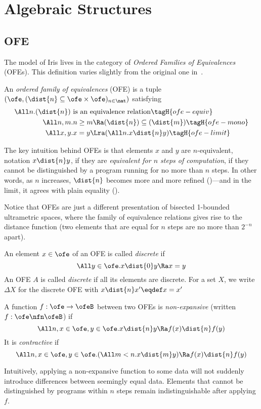 \section{Algebraic Structures}

\subsection{OFE}

The model of Iris lives in the category of \emph{Ordered Families of Equivalences} (OFEs).
This definition varies slightly from the original one in~\cite{catlogic}.

\begin{defn}
  An \emph{ordered family of equivalences} (OFE) is a tuple $(\ofe, ({\dist{n}} \subseteq \ofe \times \ofe)_{n \in \nat})$ satisfying
  \begin{align*}
    \All n. (\dist{n}) ~& \text{is an equivalence relation} \tagH{ofe-equiv} \\
    \All n, m.& n \geq m \Ra (\dist{n}) \subseteq (\dist{m}) \tagH{ofe-mono} \\
    \All x, y.& x = y \Lra (\All n. x \dist{n} y) \tagH{ofe-limit}
  \end{align*}
\end{defn}

The key intuition behind OFEs is that elements $x$ and $y$ are $n$-equivalent, notation $x \dist{n} y$, if they are \emph{equivalent for $n$ steps of computation}, \ie if they cannot be distinguished by a program running for no more than $n$ steps.
In other words, as $n$ increases, $\dist{n}$ becomes more and more refined ()---and in the limit, it agrees with plain equality ().

Notice that OFEs are just a different presentation of bisected 1-bounded ultrametric spaces, where the family of equivalence relations gives rise to the distance function (two elements that are equal for $n$ steps are no more than $2^{-n}$ apart).

\begin{defn}
  An element $x \in \ofe$ of an OFE is called \emph{discrete} if
  \[ \All y \in \ofe. x \dist{0} y \Ra x = y\]
  An OFE $A$ is called \emph{discrete} if all its elements are discrete.
  For a set $X$, we write $\Delta X$ for the discrete OFE with $x \dist{n} x' \eqdef x = x'$
\end{defn}

\begin{defn}
  A function $f : \ofe \to \ofeB$ between two OFEs is \emph{non-expansive} (written $f : \ofe \nfn \ofeB$) if
  \[\All n, x \in \ofe, y \in \ofe. x \dist{n} y \Ra f(x) \dist{n} f(y) \]
  It is \emph{contractive} if
  \[ \All n, x \in \ofe, y \in \ofe. (\All m < n. x \dist{m} y) \Ra f(x) \dist{n} f(y) \]
\end{defn}
Intuitively, applying a non-expansive function to some data will not suddenly introduce differences between seemingly equal data.
Elements that cannot be distinguished by programs within $n$ steps remain indistinguishable after applying $f$.

